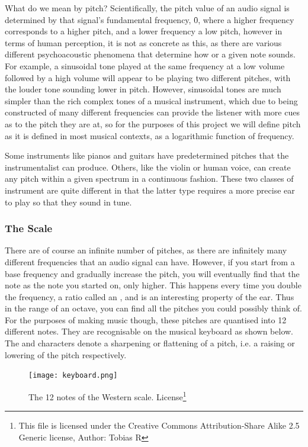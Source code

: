 	\par What do we mean by pitch? Scientifically, the pitch value of an audio signal is determined by that signal's fundamental frequency, \f0, where a higher frequency corresponds to a higher pitch, and a lower frequency a low pitch, however in terms of human perception, it is not as concrete as this, as there are various different psychoacoustic phenomena that determine how  or  a given note sounds. For example, a sinusoidal tone played at the same frequency at a low volume followed by a high volume will appear to be playing two different pitches, with the louder tone sounding lower in pitch. However, sinusoidal tones are much simpler than the rich complex tones of a musical instrument, which due to being constructed of many different frequencies can provide the listener with more cues as to the pitch they are at, so for the purposes of this project we will define pitch as it is defined in most musical contexts, as a logarithmic function of frequency.	
	
	\par Some instruments like pianos and guitars have predetermined pitches that the instrumentalist can produce. Others, like the violin or human voice, can create any pitch within a given spectrum in a continuous fashion. These two classes of instrument are quite different in that the latter type requires a more precise ear to play so that they sound in tune.
	
	\subsubsection{The Scale}
	There are of course an infinite number of pitches, as there are infinitely many different frequencies that an audio signal can have. However, if you start from a base frequency and gradually increase the pitch, you will eventually find that the note  as the note you started on, only higher. This happens every time you double the frequency, a ratio called an , and is an interesting property of the ear. Thus in the range of an octave, you can find all the pitches you could possibly think of. For the purposes of making music though, these pitches are quantised into 12 different notes. They are recognisable on the musical keyboard as shown below. The \bsq{\#} and  characters denote a sharpening or flattening of a pitch, i.e. a raising or lowering of the pitch respectively.
	
	\begin{figure}[h]
		\centering
		\texttt{[image: keyboard.png]}
		\caption[Caption]{The 12 notes of the Western scale. License\footnote{This file is licensed under the Creative Commons Attribution-Share Alike 2.5 Generic license, Author: Tobias R}}
	\end{figure}
	
